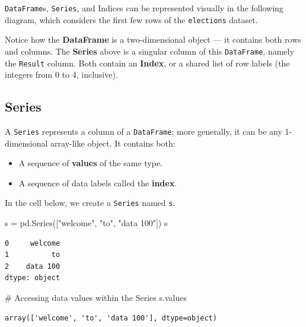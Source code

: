 \documentclass[
  letterpaper,
  DIV=11,
  numbers=noendperiod]{scrreprt}
\newenvironment{Shaded}{\begin{snugshade}}{\end{snugshade}}
\newcommand{\CommentTok}[1]{\textcolor[rgb]{0.37,0.37,0.37}{#1}}
\newcommand{\NormalTok}[1]{\textcolor[rgb]{0.00,0.23,0.31}{#1}}
\newcommand{\OperatorTok}[1]{\textcolor[rgb]{0.37,0.37,0.37}{#1}}
\newcommand{\StringTok}[1]{\textcolor[rgb]{0.13,0.47,0.30}{#1}}
\providecommand{\tightlist}{%
  \setlength{\itemsep}{0pt}\setlength{\parskip}{0pt}}\usepackage{longtable,booktabs,array}
\begin{document}
\texttt{DataFrame}s, \texttt{Series}, and Indices can be represented
visually in the following diagram, which considers the first few rows of
the \texttt{elections} dataset.

Notice how the \textbf{DataFrame} is a two-dimensional object --- it
contains both rows and columns. The \textbf{Series} above is a singular
column of this \texttt{DataFrame}, namely the \texttt{Result} column.
Both contain an \textbf{Index}, or a shared list of row labels (the
integers from 0 to 4, inclusive).

\subsection{Series}\label{series}

A \texttt{Series} represents a column of a \texttt{DataFrame}; more
generally, it can be any 1-dimensional array-like object. It contains
both:

\begin{itemize}
\tightlist
\item
  A sequence of \textbf{values} of the same type.
\item
  A sequence of data labels called the \textbf{index}.
\end{itemize}

In the cell below, we create a \texttt{Series} named \texttt{s}.

\begin{Shaded}
\begin{Highlighting}[]
\NormalTok{s }\OperatorTok{=}\NormalTok{ pd.Series([}\StringTok{"welcome"}\NormalTok{, }\StringTok{"to"}\NormalTok{, }\StringTok{"data 100"}\NormalTok{])}
\NormalTok{s}
\end{Highlighting}
\end{Shaded}

\begin{verbatim}
0     welcome
1          to
2    data 100
dtype: object
\end{verbatim}

\begin{Shaded}
\begin{Highlighting}[]
 \CommentTok{\# Accessing data values within the Series}
\NormalTok{ s.values}
\end{Highlighting}
\end{Shaded}

\begin{verbatim}
array(['welcome', 'to', 'data 100'], dtype=object)
\end{verbatim}
\end{document}
